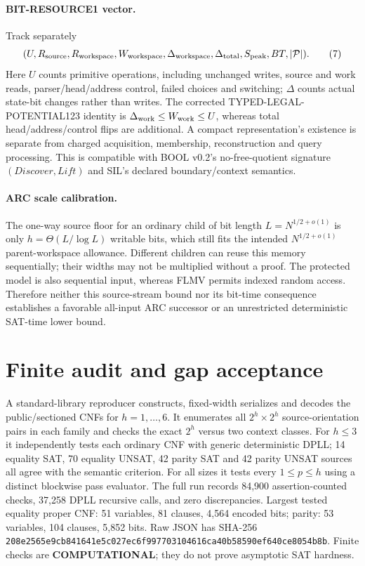 \documentclass[11pt]{article}
\begin{document}
\paragraph{BIT-RESOURCE1 vector.}
Track separately
\[
 (U,R_{\rm source},R_{\rm workspace},W_{\rm workspace},
 \Delta_{\rm workspace},\Delta_{\rm total},
 S_{\rm peak},BT,|{\cal P}|).
\tag{7}
\]
Here $U$ counts primitive operations, including unchanged writes, source and work reads, parser/head/address control, failed choices and switching; $\Delta$ counts actual state-bit changes rather than writes. The corrected TYPED-LEGAL-POTENTIAL123 identity is $\Delta_{\rm work}\le W_{\rm work}\le U$, whereas total head/address/control flips are additional. A compact representation's existence is separate from charged acquisition, membership, reconstruction and query processing. This is compatible with BOOL v0.2's no-free-quotient signature $(Discover,Lift)$ and SIL's declared boundary/context semantics.

\paragraph{ARC scale calibration.}
The one-way source floor for an ordinary child of bit length $L=N^{1/2+o(1)}$ is only $h=\Theta(L/\log L)$ writable bits, which still fits the intended $N^{1/2+o(1)}$ parent-workspace allowance. Different children can reuse this memory sequentially; their widths may not be multiplied without a proof. The protected model is also sequential input, whereas FLMV permits indexed random access. Therefore neither this source-stream bound nor its bit-time consequence establishes a favorable all-input ARC successor or an unrestricted deterministic SAT-time lower bound.

\section{Finite audit and gap acceptance}
A standard-library reproducer constructs, fixed-width serializes and decodes the public/sectioned CNFs for $h=1,\ldots,6$. It enumerates all $2^h\times2^h$ source-orientation pairs in each family and checks the exact $2^h$ versus two context classes. For $h\le3$ it independently tests each ordinary CNF with generic deterministic DPLL; 14 equality SAT, 70 equality UNSAT, 42 parity SAT and 42 parity UNSAT sources all agree with the semantic criterion. For all sizes it tests every $1\le p\le h$ using a distinct blockwise pass evaluator. The full run records 84,900 assertion-counted checks, 37,258 DPLL recursive calls, and zero discrepancies. Largest tested equality proper CNF: 51 variables, 81 clauses, 4,564 encoded bits; parity: 53 variables, 104 clauses, 5,852 bits. Raw JSON has SHA-256 \texttt{208e2565e9cb841641e5c027ec6f997703104616ca40b58590ef640ce8054b8b}. Finite checks are \textbf{COMPUTATIONAL}; they do not prove asymptotic SAT hardness.
\end{document}
